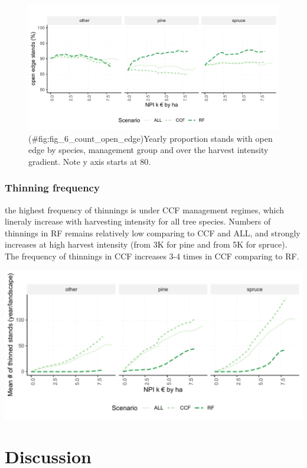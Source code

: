 \documentclass[]{elsarticle} %
\makeatletter
\def\maxwidth{\ifdim\Gin@nat@width>\linewidth\linewidth
\else\Gin@nat@width\fi}
\let\Oldincludegraphics\includegraphics
\renewcommand{\includegraphics}[1]{\Oldincludegraphics[width=\maxwidth]{#1}}
\makeatother
\begin{document}
\begin{figure}
\centering
\includegraphics{test_manus_files/figure-latex/fig_6_count_open_edge-1.pdf}
\caption{(\#fig:fig\_6\_count\_open\_edge)Yearly proportion stands with
open edge by species, management group and over the harvest intensity
gradient. Note y axis starts at 80.}
\end{figure}

\subsubsection{Thinning frequency}\label{thinning-frequency}

the highest frequency of thinnings is under CCF management regimes,
which lineraly increase with harvesting intensity for all tree species.
Numbers of thinnings in RF remains relatively low comparing to CCF and
ALL, and strongly increases at high harvest intensity (from 3K for pine
and from 5K for spruce). The frequency of thinnings in CCF increases 3-4
times in CCF comparing to RF.

\includegraphics{test_manus_files/figure-latex/unnamed-chunk-2-1.pdf}

\section{Discussion}\label{discussion}
\end{document}
